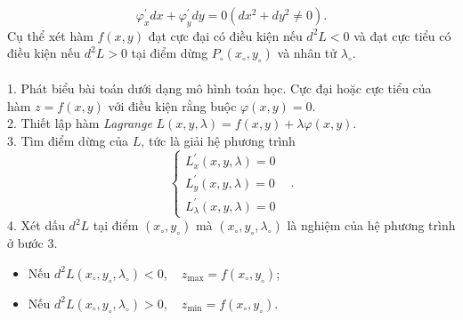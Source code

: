 $$\varphi _{x}^{'}dx+\varphi _{y}^{'}dy=0\left ( dx^2+dy^2\neq 0 \right ).  $$
Cụ thể xét hàm $f\left ( x,y \right ) $ đạt cực đại có điều kiện nếu $d^2L<0 $ và đạt cực tiểu có điều kiện nếu $d^2L>0 $ tại điểm dừng  $P_{\circ}\left ( x_\circ,y_\circ \right )$ và nhân tử $\lambda _{\circ} $.\\
 \\
1. Phát biểu bài toán dưới dạng mô hình toán học. Cực đại hoặc cực tiểu của hàm $z=f\left ( x,y \right ) $ với điều kiện rằng buộc $\varphi \left ( x,y \right )=0. $\\
2. Thiết lập hàm \textit{Lagrange} $ L\left ( x,y,\lambda  \right )=f\left ( x,y \right )+ \lambda \varphi \left ( x,y \right ). $\\
3. Tìm điểm dừng của $L$, tức là giải hệ phương trình $$\left\{\begin{matrix}
L_{x}^{'}\left ( x,y,\lambda  \right ) =0& \\ 
L_{y}^{'}\left ( x,y,\lambda  \right ) =0 & \\ 
L_{\lambda }^{'}\left ( x,y,\lambda  \right ) =0& 
\end{matrix}\right..  $$
4. Xét dấu $ d^{2}L $ tại điểm $ \left ( x_{\circ} ,y_{\circ}\right ) $ mà $\left ( x_{\circ} ,y_{\circ},\lambda _{\circ}\right ) $ là nghiệm của hệ phương trình ở bước $3.$
\begin{itemize}
	\item Nếu $d^{2}L\left ( x_{\circ},y_{\circ} ,\lambda _{\circ}\right )<0,\quad z_{\max}=f\left ( x_{\circ},y_{\circ} \right ) $;
	\item Nếu $d^{2}L\left ( x_{\circ},y_{\circ} ,\lambda _{\circ}\right )>0,\quad z_{\min}=f\left ( x_{\circ},y_{\circ} \right ) $.
\end{itemize}



